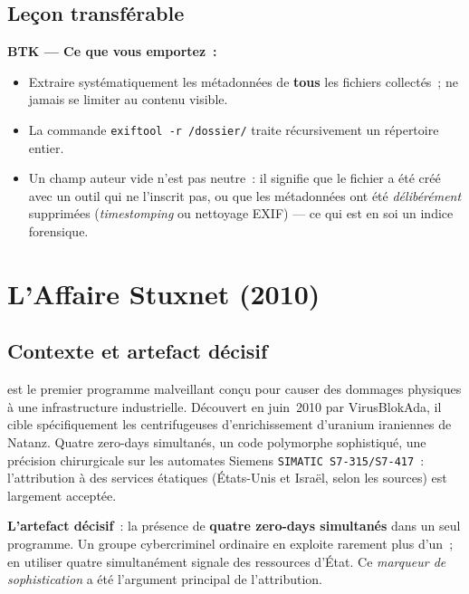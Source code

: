 \subsection{Leçon transférable}

\begin{boxresume}
\textbf{BTK --- Ce que vous emportez~:}
\begin{itemize}
    \item Extraire systématiquement les métadonnées de \textbf{tous} les
          fichiers collectés~; ne jamais se limiter au contenu visible.
    \item La commande \lstinline[language=bash_forensique]{exiftool -r /dossier/}
          traite récursivement un répertoire entier.
    \item Un champ auteur vide n'est pas neutre~: il signifie que le fichier
          a été créé avec un outil qui ne l'inscrit pas, ou que les
          métadonnées ont été \emph{délibérément} supprimées (\textit{timestomping}
          ou nettoyage EXIF) --- ce qui est en soi un indice forensique.
\end{itemize}
\end{boxresume}

\section{L'Affaire Stuxnet (2010)}
\label{sec:stuxnet}

\subsection{Contexte et artefact décisif}

 est le premier programme malveillant conçu pour causer des
dommages physiques à une infrastructure industrielle. Découvert en juin~2010
par VirusBlokAda, il cible spécifiquement les centrifugeuses d'enrichissement
d'uranium iraniennes de Natanz. Quatre zero-days simultanés, un code polymorphe
sophistiqué, une précision chirurgicale sur les automates Siemens
\texttt{SIMATIC S7-315/S7-417}~: l'attribution à des services étatiques
(États-Unis et Israël, selon les sources) est largement acceptée.

\medskip

\textbf{L'artefact décisif}~: la présence de \textbf{quatre zero-days
simultanés} dans un seul programme. Un groupe cybercriminel ordinaire
en exploite rarement plus d'un~; en utiliser quatre simultanément signale
des ressources d'État. Ce \textit{marqueur de sophistication} a été
l'argument principal de l'attribution.

